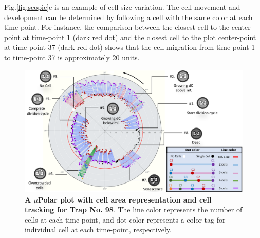 \documentclass[conference]{IEEEtran}
\begin{document}
Fig.\ref{fig:scopic}c is an example of cell size variation. The cell movement and development can be determined by following a cell with the same color at each time-point. For instance, the comparison between the closest cell to the center-point at time-point 1 (dark red dot) and the closest cell to the plot center-point at time-point 37 (dark red dot) shows that the cell migration from time-point 1 to time-point 37 is approximately 20 units. 

 
\begin{figure}
\centering
\includegraphics[width=\textwidth,height=10 cm]{Patterns/explain.pdf}
\caption{ \textbf{ A $\mu$Polar plot with cell area representation and cell tracking for Trap No. 98}. The line color represents the number of cells at each time-point, and dot color represents a color tag for individual cell at each time-point, respectively.
}
\label{fig:explain}
\end{figure}
\end{document}
